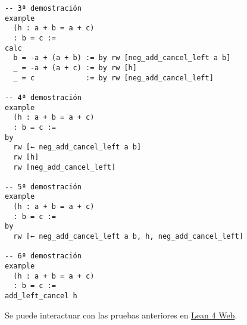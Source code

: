 \begin{verbatim}
-- 3ª demostración
example
  (h : a + b = a + c)
  : b = c :=
calc
  b = -a + (a + b) := by rw [neg_add_cancel_left a b]
  _ = -a + (a + c) := by rw [h]
  _ = c            := by rw [neg_add_cancel_left]

-- 4ª demostración
example
  (h : a + b = a + c)
  : b = c :=
by
  rw [← neg_add_cancel_left a b]
  rw [h]
  rw [neg_add_cancel_left]

-- 5ª demostración
example
  (h : a + b = a + c)
  : b = c :=
by
  rw [← neg_add_cancel_left a b, h, neg_add_cancel_left]

-- 6ª demostración
example
  (h : a + b = a + c)
  : b = c :=
add_left_cancel h
\end{verbatim}
Se puede interactuar con las pruebas anteriores en \href{https://lean.math.hhu.de/\#url=https://raw.githubusercontent.com/jaalonso/Calculemus2/main/src/Cancelativa\_izquierda.lean}{Lean 4 Web}.

